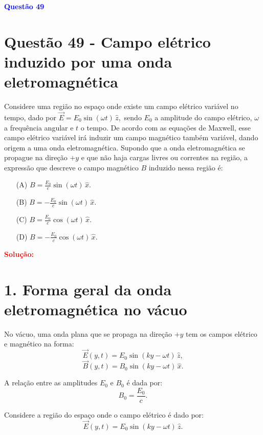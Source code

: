 \documentclass[a4paper,12pt]{article}
\begin{document}
\begin{flushleft}
\textbf{\textcolor{blue}{\Large Quest\~ao 49}}\\
\noindent
\section{Quest\~ao 49 - Campo elétrico induzido por uma onda eletromagnética}
Considere uma região no espaço onde existe um campo elétrico variável no tempo, dado por $\vec{E} = E_0 \sin(\omega t) \, \hat{z},$
sendo \(E_0\) a amplitude do campo elétrico, \(\omega\) a frequência angular e \(t\) o tempo. De acordo com as equações de Maxwell, 
esse campo elétrico variável irá induzir um campo magnético também variável, dando origem a uma onda eletromagnética. Supondo que a 
onda eletromagnética se propague na direção \(+y\) e que não haja cargas livres ou correntes na região, a expressão que descreve o 
campo magnético \(B\) induzido nessa região é:


\begin{itemize}
\item[(A)] $B = \frac{ E_0}{c} \sin(\omega t) \, \hat{x}.$
\item[(B)] $B = -\frac{E_0}{c} \sin(\omega t) \, \hat{x}.$
\item[(C)] $B = \frac{E_0}{c} \cos(\omega t) \, \hat{x}.$
\item[(D)] $B = -\frac{E_0}{c} \cos(\omega t) \, \hat{x}.$
\end{itemize}

\vspace{0.5cm}

\textcolor{red}{\textbf{Solução:}}\\



\section*{1. Forma geral da onda eletromagnética no vácuo}

No vácuo, uma onda plana que se propaga na direção \(+\hat{y}\) tem os campos elétrico e magnético na forma:
\[
\vec{E}(y,t) = E_0 \sin(k y - \omega t) \, \hat{z},
\]
\[
\vec{B}(y,t) = B_0 \sin(k y - \omega t) \, \hat{x}.
\]

A relação entre as amplitudes \(E_0\) e \(B_0\) é dada por:
\[
B_0 = \frac{E_0}{c}.
\]

Considere a região do espaço onde o campo elétrico é dado por:
\[
\vec{E}(y,t) = E_0 \sin(k y - \omega t) \, \hat{z}.
\]


\end{flushleft}
\end{document}
